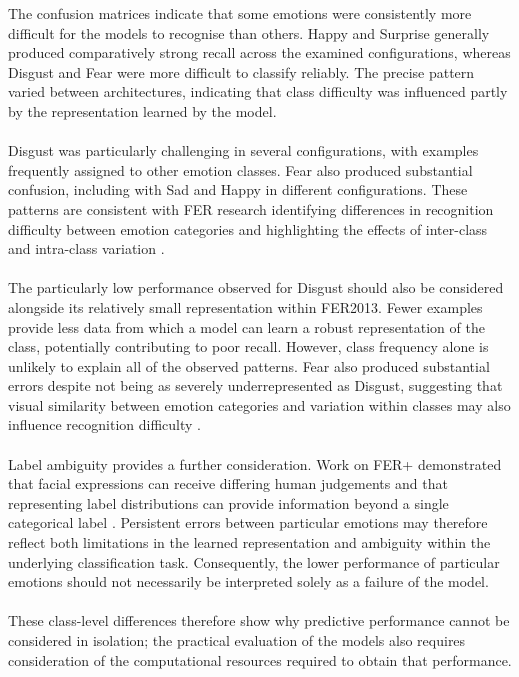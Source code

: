 \documentclass[12pt, a4paper]{report}
\begin{document}
				The confusion matrices indicate that some emotions were consistently more difficult for the models to recognise than others. Happy and Surprise generally produced comparatively strong recall across the examined configurations, whereas Disgust and Fear were more difficult to classify reliably. The precise pattern varied between architectures, indicating that class difficulty was influenced partly by the representation learned by the model.\\\\
				Disgust was particularly challenging in several configurations, with examples frequently assigned to other emotion classes. Fear also produced substantial confusion, including with Sad and Happy in different configurations. These patterns are consistent with FER research identifying differences in recognition difficulty between emotion categories and highlighting the effects of inter-class and intra-class variation \cite{Pham2023InterIntraFER, Georgiou2026FERReview}.\\\\
				The particularly low performance observed for Disgust should also be considered alongside its relatively small representation within FER2013. Fewer examples provide less data from which a model can learn a robust representation of the class, potentially contributing to poor recall. However, class frequency alone is unlikely to explain all of the observed patterns. Fear also produced substantial errors despite not being as severely underrepresented as Disgust, suggesting that visual similarity between emotion categories and variation within classes may also influence recognition difficulty \cite{Pham2023InterIntraFER}.\\\\
				Label ambiguity provides a further consideration. Work on FER+ demonstrated that facial expressions can receive differing human judgements and that representing label distributions can provide information beyond a single categorical label \cite{Barsoum2016FERPlus}. Persistent errors between particular emotions may therefore reflect both limitations in the learned representation and ambiguity within the underlying classification task. Consequently, the lower performance of particular emotions should not necessarily be interpreted solely as a failure of the model.\\\\
				These class-level differences therefore show why predictive performance cannot be considered in isolation; the practical evaluation of the models also requires consideration of the computational resources required to obtain that performance.
				
\end{document}
